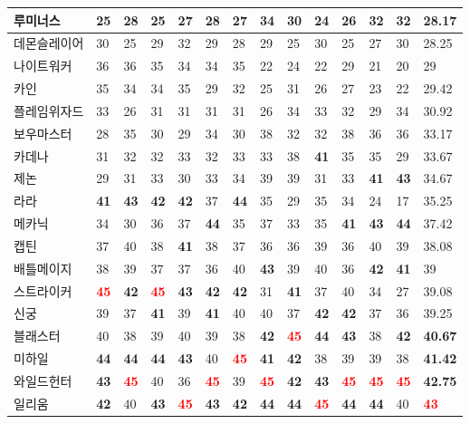 \documentclass[
]{article}
\begin{document}
\begin{table}[H]
{\begin{tabular}{l|l|l|l|l|l|l|l|l|l|l|l|l|l}
\hline
루미너스 & 25 & 28 & 25 & 27 & 28 & 27 & 34 & 30 & 24 & 26 & 32 & 32 & 28.17\\
\hline
데몬슬레이어 & 30 & 25 & 29 & 32 & 29 & 28 & 29 & 25 & 30 & 25 & 27 & 30 & 28.25\\
\hline
나이트워커 & 36 & 36 & 35 & 34 & 34 & 35 & 22 & 24 & 22 & 29 & 21 & 20 & 29\\
\hline
카인 & 35 & 34 & 34 & 35 & 29 & 32 & 25 & 31 & 26 & 27 & 23 & 22 & 29.42\\
\hline
플레임위자드 & 33 & 26 & 31 & 31 & 31 & 31 & 26 & 34 & 33 & 32 & 29 & 34 & 30.92\\
\hline
보우마스터 & 28 & 35 & 30 & 29 & 34 & 30 & 38 & 32 & 32 & 38 & 36 & 36 & 33.17\\
\hline
카데나 & 31 & 32 & 32 & 33 & 32 & 33 & 33 & 38 & \textbf{41} & 35 & 35 & 29 & 33.67\\
\hline
제논 & 29 & 31 & 33 & 30 & 33 & 34 & 39 & 39 & 31 & 33 & \textbf{41} & \textbf{43} & 34.67\\
\hline
라라 & \textbf{41} & \textbf{43} & \textbf{42} & \textbf{42} & 37 & \textbf{44} & 35 & 29 & 35 & 34 & 24 & 17 & 35.25\\
\hline
메카닉 & 34 & 30 & 36 & 37 & \textbf{44} & 35 & 37 & 33 & 35 & \textbf{41} & \textbf{43} & \textbf{44} & 37.42\\
\hline
캡틴 & 37 & 40 & 38 & \textbf{41} & 38 & 37 & 36 & 36 & 39 & 36 & 40 & 39 & 38.08\\
\hline
배틀메이지 & 38 & 39 & 37 & 37 & 36 & 40 & \textbf{43} & 39 & 40 & 36 & \textbf{42} & \textbf{41} & 39\\
\hline
스트라이커 & \textcolor{red}{\textbf{45}} & \textbf{42} & \textcolor{red}{\textbf{45}} & \textbf{43} & \textbf{42} & \textbf{42} & 31 & \textbf{41} & 37 & 40 & 34 & 27 & 39.08\\
\hline
신궁 & 39 & 37 & \textbf{41} & 39 & \textbf{41} & 40 & 40 & 37 & \textbf{42} & \textbf{42} & 37 & 36 & 39.25\\
\hline
블래스터 & 40 & 38 & 39 & 40 & 39 & 38 & \textbf{42} & \textcolor{red}{\textbf{45}} & \textbf{44} & \textbf{43} & 38 & \textbf{42} & \textbf{40.67}\\
\hline
미하일 & \textbf{44} & \textbf{44} & \textbf{44} & \textbf{43} & 40 & \textcolor{red}{\textbf{45}} & \textbf{41} & \textbf{42} & 38 & 39 & 39 & 38 & \textbf{41.42}\\
\hline
와일드헌터 & \textbf{43} & \textcolor{red}{\textbf{45}} & 40 & 36 & \textcolor{red}{\textbf{45}} & 39 & \textcolor{red}{\textbf{45}} & \textbf{42} & \textbf{43} & \textcolor{red}{\textbf{45}} & \textcolor{red}{\textbf{45}} & \textcolor{red}{\textbf{45}} & \textbf{42.75}\\
\hline
일리움 & \textbf{42} & 40 & \textbf{43} & \textcolor{red}{\textbf{45}} & \textbf{43} & \textbf{42} & \textbf{44} & \textbf{44} & \textcolor{red}{\textbf{45}} & \textbf{44} & \textbf{44} & 40 & \textcolor{red}{\textbf{43}}\\
\hline
\end{tabular}}
\end{table}
\end{document}
